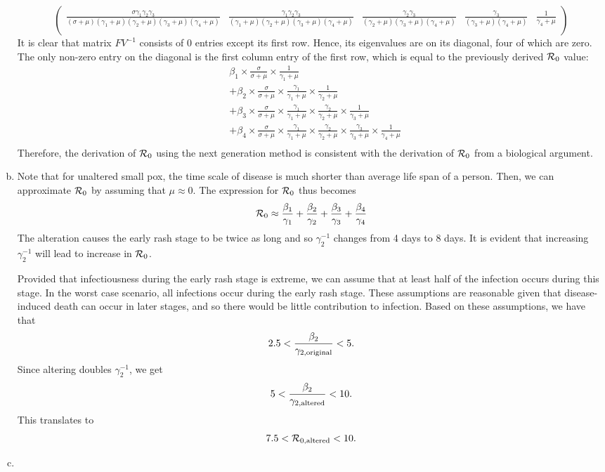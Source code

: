 \documentclass[12pt]{article}\usepackage[]{graphicx}\usepackage[]{color}
\begin{document}
\begin{enumerate}[(a)]
{{$$\begin{pmatrix}
\frac{\sigma \gamma_1 \gamma_2 \gamma_3}{(\sigma + \mu)(\gamma_1 + \mu)(\gamma_2 + \mu)(\gamma_3 + \mu)(\gamma_4  +\mu)} & \frac{\gamma_1 \gamma_2 \gamma_3}{(\gamma_1 + \mu)(\gamma_2 + \mu)(\gamma_3 + \mu)(\gamma_4  +\mu)} & \frac{\gamma_2 \gamma_3}{(\gamma_2 + \mu)(\gamma_3 + \mu)(\gamma_4  +\mu)} & \frac{\gamma_3}{(\gamma_3 + \mu)(\gamma_4  +\mu)} & \frac{1}{\gamma_4  +\mu}\\
\end{pmatrix}
$$
It is clear that matrix $FV^{-1}$ consists of 0 entries except its first row.
Hence, its eigenvalues are on its diagonal, four of which are zero. The only non-zero entry on the diagonal is the first column entry of the first row, which is equal to the previously derived ${\cal R}_0$ value:
$$
\begin{aligned}
&\beta_1 \times \frac{\sigma}{\sigma + \mu} \times \frac{1}{\gamma_1 + \mu}\\
&+ \beta_2 \times \frac{\sigma}{\sigma + \mu} \times \frac{\gamma_1}{\gamma_1 + \mu} \times \frac{1}{\gamma_2 + \mu}\\
&+ \beta_3 \times \frac{\sigma}{\sigma + \mu} \times \frac{\gamma_1}{\gamma_1 + \mu} \times \frac{\gamma_2}{\gamma_2 + \mu} \times \frac{1}{\gamma_3 + \mu}\\
&+ \beta_4 \times \frac{\sigma}{\sigma + \mu} \times \frac{\gamma_1}{\gamma_1 + \mu} \times \frac{\gamma_2}{\gamma_2 + \mu} \times \frac{\gamma_3}{\gamma_3 + \mu} \times \frac{1}{\gamma_4 + \mu}\\
\end{aligned}
$$
Therefore, the derivation of ${\cal R}_0$ using the next generation method is consistent with the derivation of ${\cal R}_0$ from a biological argument.
}}



  \item \Rd

{\color{blue} {    
Note that for unaltered small pox, the time scale of disease is much shorter than average life span of a person. Then, we can approximate ${\cal R}_0$ by assuming that $\mu \approx 0$. The expression for ${\cal R}_0$ thus becomes
$$
{\cal R}_0 \approx \frac{\beta_1}{\gamma_1} + \frac{\beta_2}{\gamma_2} + \frac{\beta_3}{\gamma_3} + \frac{\beta_4}{\gamma_4}
$$
The alteration causes the early rash stage to be twice as long and so $\gamma_2^{-1}$ changes from 4 days to 8 days.
It is evident that increasing $\gamma_2^{-1}$ will lead to increase in ${\cal R}_0$.

Provided that infectiousness during the early rash stage is extreme, we can assume that at least half of the infection occurs during this stage. In the worst case scenario, all infections occur during the early rash stage. These assumptions are reasonable given that disease-induced death can occur in later stages, and so there would be little contribution to infection.
Based on these assumptions, we have that
$$
2.5 < \frac{\beta_2}{\gamma_{2,\tiny{\textrm{original}}}} < 5.
$$
Since altering doubles $\gamma_2^{-1}$, we get
$$
5 < \frac{\beta_2}{\gamma_{2,\tiny{\textrm{altered}}}} < 10.
$$
This translates to
$$
7.5 < {\cal R}_{0, \tiny{\textrm{altered}}} <10.
$$
}}
  \item \qRe


\end{enumerate}
\end{document}
